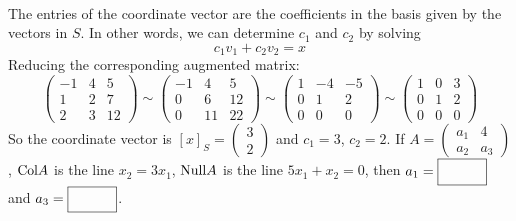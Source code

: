     \ifnum {} {\color{DarkBlue} \\[12pt] The entries of the coordinate vector are the coefficients in the basis given by the vectors in $S$. In other words, we can determine $c_1$ and $c_2$ by solving 
    $$c_1v_1 + c_2v_2 = x$$
    Reducing the corresponding augmented matrix: 
    $$
    \begin{pmatrix} -1&4&5\\1&2&7\\2&3&12\end{pmatrix} 
    \sim \begin{pmatrix} -1&4&5\\0&6&12\\0&11&22\end{pmatrix} 
    \sim \begin{pmatrix} 1&-4&-5\\0&1&2\\0&0&0\end{pmatrix} 
    \sim \begin{pmatrix} 1&0&3\\0&1&2\\0&0&0\end{pmatrix} 
    $$
    So the coordinate vector is $[x]_S = \begin{pmatrix} 3\\2\end{pmatrix}$ and $c_1 = 3$, $c_2 = 2$. 
    } 
    \fi  
\fi 
\ifnum {}
    If $A = \begin{pmatrix} a_1&4\\a_2&a_3\end{pmatrix}$, $\text{Col} A$ is the line $x_2=3x_1$, $\text{Null} A$ is the line $5x_1+x_2=0$, then 
    $a_1 = \framebox{\strut\hspace{1.0cm}}$ and 
    $a_3 = \framebox{\strut\hspace{1.0cm}}$. 
    
